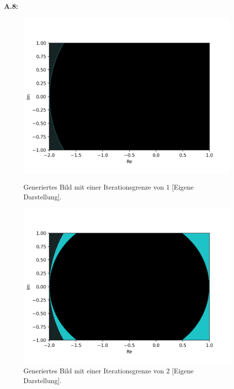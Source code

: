 \noindent\textbf{A.8:}\label{app:8}
\vspace*{-2ex}
\begin{figure}[H]
\centering
\begin{minipage}[t]{0.48\textwidth}
  \centering
  \includegraphics[width=\linewidth]{images/maxBorder/1}
  \vspace*{-8ex}
  \caption{Generiertes Bild mit einer Iterationsgrenze von $1$ [Eigene Darstellung].}
  \label{app:8.1}
\end{minipage}%
\hspace{2ex}
\begin{minipage}[t]{0.48\textwidth}
  \centering
  \includegraphics[width=\linewidth]{images/maxBorder/2}
  \vspace*{-8ex}
  \caption{Generiertes Bild mit einer Iterationsgrenze von $2$ [Eigene Darstellung].}
  \label{app:8.2}
\end{minipage}
\label{fig:mandelbrot-set-max-border-1}
\end{figure}
\newpage

